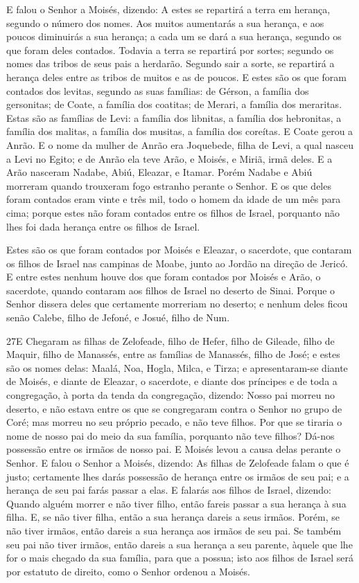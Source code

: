 E falou o Senhor a Moisés, dizendo: A estes se repartirá a
terra em herança, segundo o número dos nomes. Aos muitos
aumentarás a sua herança, e aos poucos diminuirás a sua herança; a
cada um se dará a sua herança, segundo os que foram deles contados.
Todavia a terra se repartirá por sortes; segundo os nomes das
tribos de seus pais a herdarão. Segundo sair a sorte, se
repartirá a herança deles entre as tribos de muitos e as de poucos.
E estes são os que foram contados dos levitas, segundo as
suas famílias: de Gérson, a família dos gersonitas; de Coate, a
família dos coatitas; de Merari, a família dos meraritas.
Estas são as famílias de Levi: a família dos libnitas, a
família dos hebronitas, a família dos malitas, a família dos
musitas, a família dos coreítas. E Coate gerou a Anrão. E o
nome da mulher de Anrão era Joquebede, filha de Levi, a qual nasceu
a Levi no Egito; e de Anrão ela teve Arão, e Moisés, e Miriã, irmã
deles. E a Arão nasceram Nadabe, Abiú, Eleazar, e Itamar.
Porém Nadabe e Abiú morreram quando trouxeram fogo estranho
perante o Senhor. E os que deles foram contados eram vinte e
três mil, todo o homem da idade de um mês para cima; porque estes
não foram contados entre os filhos de Israel, porquanto não lhes foi
dada herança entre os filhos de Israel.

Estes são os que foram contados por Moisés e Eleazar, o
sacerdote, que contaram os filhos de Israel nas campinas de Moabe,
junto ao Jordão na direção de Jericó. E entre estes nenhum
houve dos que foram contados por Moisés e Arão, o sacerdote, quando
contaram aos filhos de Israel no deserto de Sinai. Porque o
Senhor dissera deles que certamente morreriam no deserto; e nenhum
deles ficou senão Calebe, filho de Jefoné, e Josué, filho de Num.

\medskip

\lettrine{27} E Chegaram as filhas de Zelofeade, filho de
Hefer, filho de Gileade, filho de Maquir, filho de Manassés, entre
as famílias de Manassés, filho de José; e estes são os nomes delas:
Maalá, Noa, Hogla, Milca, e Tirza; e apresentaram-se diante de
Moisés, e diante de Eleazar, o sacerdote, e diante dos príncipes e
de toda a congregação, à porta da tenda da congregação, dizendo:
Nosso pai morreu no deserto, e não estava entre os que se
congregaram contra o Senhor no grupo de Coré; mas morreu no seu
próprio pecado, e não teve filhos. Por que se tiraria o nome de
nosso pai do meio da sua família, porquanto não teve filhos? Dá-nos
possessão entre os irmãos de nosso pai. E Moisés levou a causa
delas perante o Senhor. E falou o Senhor a Moisés, dizendo:
As filhas de Zelofeade falam o que é justo; certamente lhes
darás possessão de herança entre os irmãos de seu pai; e a herança
de seu pai farás passar a elas. E falarás aos filhos de Israel,
dizendo: Quando alguém morrer e não tiver filho, então fareis passar
a sua herança à sua filha. E, se não tiver filha, então a sua
herança dareis a seus irmãos. Porém, se não tiver irmãos,
então dareis a sua herança aos irmãos de seu pai. Se também
seu pai não tiver irmãos, então dareis a sua herança a seu parente,
àquele que lhe for o mais chegado da sua família, para que a possua;
isto aos filhos de Israel será por estatuto de direito, como o
Senhor ordenou a Moisés.

